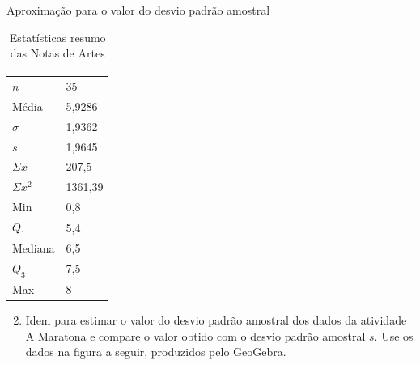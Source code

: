 {\begin{task}{Aproximação para o valor do desvio padrão amostral}
\begin{table}[H]
\centering
\begin{tabular}{|l|l|}
\hline
\multicolumn{2}{|c|}{\cellcolor{\currentcolor!80}{\textcolor{white}{\textbf{Estatística}}}}\\
\hline
$n$ & 35 \\
\hline
Média & 5,9286 \\
\hline
$\sigma$ & 1,9362 \\
\hline
$s$ & 1,9645 \\
\hline
$\Sigma x$ & 207,5 \\
\hline
$\Sigma x^2$ & 1361,39 \\
\hline
Min & 0,8 \\
\hline
$Q_1$ & 5,4 \\
\hline
Mediana & 6,5 \\
\hline
$Q_3$ & 7,5 \\
\hline
Max & 8 \\
\hline
\end{tabular}
\caption{Estatísticas resumo das Notas de Artes}\label{\detokenize{PE104-5:fig-resumonartes}}\label{\detokenize{PE104-5:id2}}
\end{table}

\begin{enumerate}
\setcounter{enumi}{1}
\item {} 
Idem para estimar o valor do desvio padrão amostral dos dados da atividade \hyperref[\detokenize{PE104-0:ativ-maratona-de-ny}]{A Maratona} e compare o valor obtido com o desvio padrão amostral \(s\). Use os dados na figura a seguir, produzidos pelo GeoGebra.

\end{enumerate}


\end{task}}
